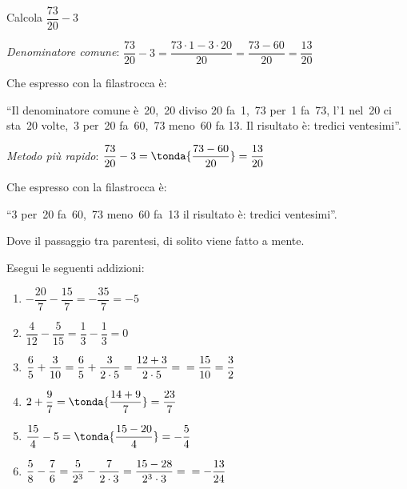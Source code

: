\begin{esempio}{}{} Calcola 
\(\dfrac{73}{20} - 3\)

\vspace{1em}
\emph{Denominatore comune}: \quad
\(\dfrac{73}{20} - 3 = \dfrac{73 \cdot 1 - 3 \cdot 20}{20} =
  \dfrac{73 - 60}{20} = \dfrac{13}{20}\)

Che espresso con la filastrocca è: 

``Il denominatore comune è~20,~20 diviso 20 fa~1,~73 per~1 fa~73, 
l'1 nel~20 ci sta~20 volte,~3 per~20 fa~60,~73 meno~60 fa 13.
Il risultato è: tredici ventesimi''.

\vspace{1em}
\emph{Metodo più rapido}: \quad
\(\dfrac{73}{20} - 3 = \tonda{\dfrac{73 - 60}{20}} = \dfrac{13}{20}\)

Che espresso con la filastrocca è: 

``3 per~20 fa~60,~73 meno~60 fa~13 il risultato è: tredici ventesimi''.

Dove il passaggio tra parentesi, di solito viene fatto a mente.
\end{esempio}

\begin{esempio}{}{}
 Esegui le seguenti addizioni:
 \begin{htmulticols}{2}
 \begin{enumerate} %
  \item \(-\dfrac{20}{7} -\dfrac{15}{7} = -\dfrac{35}{7} = -5\)
  \item \(\dfrac{4}{12} - \dfrac{5}{15} = \dfrac{1}{3} - \dfrac{1}{3} = 0\)
  \item \(\dfrac{6}{5} + \dfrac{3}{10} = 
          \dfrac{6}{5} + \dfrac{3}{2 \cdot 5} = \dfrac{12 + 3}{2 \cdot 5} = 
          \newline = \dfrac{15}{10} = \dfrac{3}{2}\)
  \item \(2 + \dfrac{9}{7} = \tonda{\dfrac{14 + 9}{7}} = \dfrac{23}{7}\)
  \item \(\dfrac{15}{4} - 5 = \tonda{\dfrac{15 - 20}{4}} = -\dfrac{5}{4}\)
  \item \(\dfrac{5}{8} - \dfrac{7}{6} = 
          \dfrac{5}{2^3} - \dfrac{7}{2 \cdot 3} = 
          \dfrac{15 - 28}{2^3 \cdot 3} = \newline = -\dfrac{13}{24}\)
 \end{enumerate}
 \end{htmulticols}
\end{esempio}


